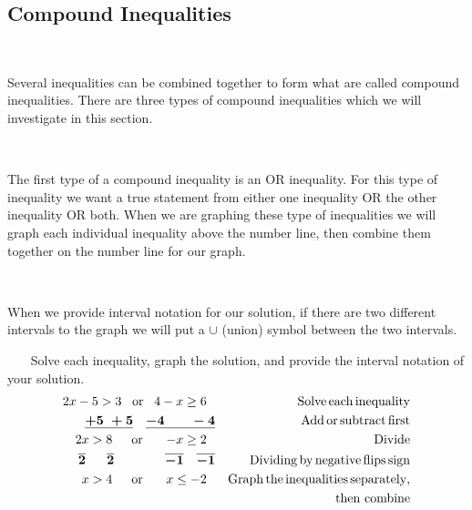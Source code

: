 \subsection{Compound Inequalities}

{}\par
~\par
Several inequalities can be combined together to form what are called compound
inequalities. There are three types of compound inequalities which we will
investigate in this section.\par
~\par
The first type of a compound inequality is an OR inequality. For this type of
inequality we want a true statement from either one inequality OR the other
inequality OR both. When we are graphing these type of inequalities we will
graph each individual inequality above the number line, then combine them together on the number line for our graph.\par
~\par
When we provide interval notation for our solution, if there are two different
intervals to the graph we will put a $\cup$ (union) symbol between the two intervals.%

\begin{example}\label{Lin100}~~~ Solve each inequality, graph the solution, and provide the interval notation of your solution.
  \begin{eqnarray*}
    2 x - 5 > 3 \operatorname{~~or~~} 4 - x \geq 6~~ &  & \operatorname{Solve} \operatorname{each}
    \operatorname{inequality}\\
    \boldsymbol{\underline{+ 5 ~ + 5}} ~~~ \boldsymbol{\underline{- 4 ~~~~~~ - 4}} &  & \operatorname{Add} \operatorname{or}
    \operatorname{subtract} \operatorname{first}\\
    2 x > 8 \operatorname{~~~~or~~~~~} - x \geq 2~~ &  & \operatorname{Divide}\\
    \boldsymbol{\overline{2} ~~~~~ \overline{2}} ~~~~~~~~~~~~ \boldsymbol{\overline{- 1} ~~~ \overline{- 1}} &  &
    \operatorname{Dividing} \operatorname{by} \operatorname{negative} \operatorname{flips} \operatorname{sign}\\
    x > 4 \operatorname{~~~~or~~~~~} x \leq - 2~~ &  & \operatorname{Graph} \operatorname{the}
    \operatorname{inequalities} \operatorname{separately},\\
		& & ~~~\operatorname{then~combine}
  \end{eqnarray*}
\end{example}

